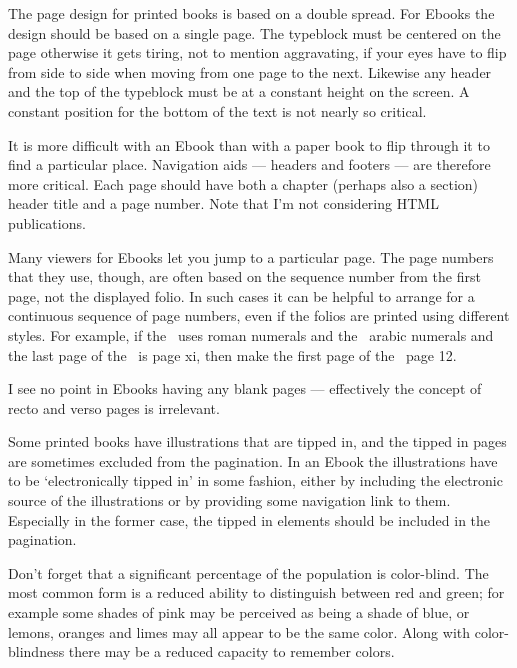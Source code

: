 \documentclass[10pt,a4paper,extrafontsizes]{memoir}
\begin{document}
\begin{paracol}{2}
    The page design for printed books is based on a double spread. For
Ebooks the design should be based on a single page. The 
typeblock must be centered on the page otherwise it gets 
tiring, not to mention aggravating, if your eyes have to 
flip from side to side when moving from one page to the next. Likewise
any header and the top of the typeblock 
must be at a constant height on the screen. A constant position for the 
bottom of the text is not nearly so critical.

    It is more difficult with an Ebook than with a paper book 
to flip through it to find a particular place. 
Navigation aids --- headers and footers ---
are therefore more critical. Each page should have both a chapter 
(perhaps also a section) header title and a page number. 
Note that I'm not considering HTML publications.

    Many viewers for Ebooks let you jump to a particular page. The page
numbers that they use, though, are often based on the sequence number from
the first page, not the displayed folio. In such cases it 
can be helpful to arrange for a continuous sequence of page numbers, 
even if the folios are printed using different styles. 
For example, if the \pixfrontmatter\ uses roman numerals and the 
\pixmainmatter\ arabic numerals and the last page of the
\pixfrontmatter\ is page xi, then make the first page of the \pixmainmatter\ 
page 12.

    I see no point in Ebooks having any blank pages --- effectively the
concept of recto and verso pages is irrelevant.

    Some printed books have illustrations that are 
tipped in, and the tipped in pages are sometimes excluded from the 
pagination. In an Ebook the illustrations\index{illustration} have to 
be `electronically tipped in' in some fashion, either
by including the electronic source of the illustrations 
or by providing some navigation link to them. Especially in the former case, 
the tipped in elements should be included in the pagination.

    Don't forget that a significant percentage of the population is 
color-blind.\index{color|(}\index{color!blind} 
The most common form is a reduced ability to distinguish
between red and green; for example some shades of pink may be perceived
as being a shade of blue, or lemons, oranges and limes may all appear to
be the same color. Along with color-blindness there may be a reduced
capacity to remember colors.


\end{paracol}
\end{document}
